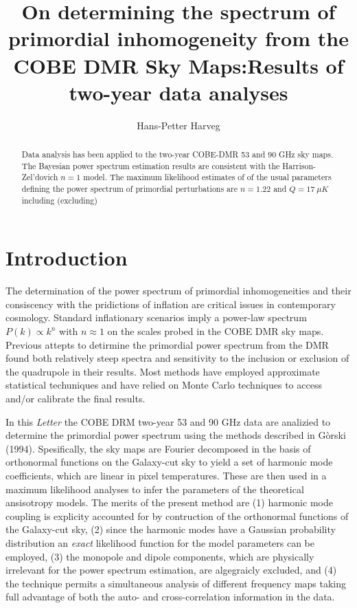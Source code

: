 \documentclass{emulateapj}
\begin{document}
\title{On determining the spectrum of primordial inhomogeneity from the COBE DMR Sky Maps:Results of two-year data analyses}

\author{Hans-Petter Harveg}





\begin{abstract}
  Data analysis has been applied to the two-year COBE-DMR 53 and 90 GHz sky maps. The Bayesian power spectrum estimation results are consistent with the Harrison-Zel'dovich $n = 1$ model. The maximum likelihood estimates of of the usual parameters defining the power spectrum of primordial perturbations are $n = 1.22$ and $Q = 17 \ \mu K$ including (excluding) 
\end{abstract}

\section{Introduction}
\label{sec:introduction}
  The determination of the power spectrum of primordial inhomogeneities and their consiscency with the pridictions of inflation are critical issues in contemporary cosmology. Standard inflationary scenarios imply a power-law spectrum $P(k) \propto k^n$ with $n \approx 1$ on the scales probed in the COBE DMR sky maps. Previous attepts to detirmine the primordial power spectrum from the DMR found both relatively steep spectra and sensitivity to the inclusion or exclusion of the quadrupole in their results. Most methods have employed approximate statistical techuniques and have relied on Monte Carlo techniques to access and/or calibrate the final results.

  In this \textit{Letter} the COBE DRM two-year 53 and 90 GHz data are analizied to determine the primordial power spectrum using the methods described in Gòrski (1994). Spesifically, the sky maps are Fourier decomposed in the basis of orthonormal functions on the Galaxy-cut sky to yield a set of harmonic mode coefficients, which are linear in pixel temperatures. These are then used in a maximum likelihood analyses to infer the parameters of the theoretical ansisotropy models. The merits of the present method are (1) harmonic mode coupling is explicity accounted for by contruction of the orthonormal functions of the Galaxy-cut sky, (2) since the harmonic modes have a Gaussian probability distribution an \textit{exact} likelihood function for the model parameters can be employed, (3) the monopole and dipole components, which are physically irrelevant for the power spectrum estimation, are algegraicly excluded, and (4) the technique permits a simultaneous analysis of different frequency maps taking full advantage of both the auto- and cross-correlation information in the data.
\end{document}
